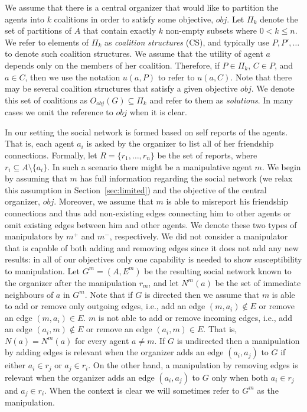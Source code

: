 \documentclass{article}
\def\tuple#1{( #1 )}
\begin{document}
We assume that there is a central organizer that would like to partition the agents into $k$ coalitions in order to satisfy some objective, $obj$.
Let $\Pi_k$ denote the set of partitions of $A$ that contain exactly $k$ non-empty subsets where $0 < k \leq n$. 
We refer to elements of $\Pi_k$ as \emph{coalition structures} (CS), and typically use $P, P', \ldots$ to denote such coalition structures.
We assume that the utility of agent $a$ depends only on the members of her coalition. Therefore, if $P \in \Pi_{k}$, $C\in P$, and $a\in C$, then we use the notation $u(a,P)$ to refer to $u(a,C)$.  
Note that there may be several coalition structures that satisfy a given objective $obj$. We denote this set of coalitions as $O_{obj}(G) \subseteq \Pi_k$ and refer to them as \emph{solutions}. In many cases we  omit the reference to $obj$ when it is clear.

In our setting the social network is formed based on self reports of the agents. That is, each agent $a_i$ is asked by the organizer to list all of her friendship connections. Formally, let $R=\{r_{1},\ldots, r_{n}\}$ be the set of reports, where $r_{i}\subseteq A\setminus\{a_{i}\}$.
In such a scenario there might be a manipulative agent $m$. We begin by assuming that $m$ has full information regarding the social network (we relax this assumption in Section~\ref{sec:limited}) and the objective of the central organizer, $obj$.
Moreover, we assume that $m$ is able to misreport his friendship connections and thus add non-existing edges connecting him to other agents or omit existing edges between him and other agents. %
We denote these two types of manipulators by $m^+$ and $m^-$, respectively. We did not consider a manipulator that is capable of both adding and removing edges since it does not add any new results: in all of our objectives only one capability is needed to show susceptibility to manipulation.
Let $G^m=\tuple{A,E^m}$ be the resulting social network known to the organizer after the manipulation $r_m$, and let $N^m(a)$ be the set of immediate neighbours of $a$ in $G^m$.
Note that if $G$ is directed then we assume that $m$ is able to add or remove only outgoing edges, i.e., add an edge $(m,a_i) \notin E$ or remove an edge $(m,a_i) \in E$. $m$ is not able to add or remove incoming edges, i.e., add an edge $(a_i,m) \notin E$ or remove an edge $(a_i,m) \in E$. That is, $N(a)=N^m(a)$ for every agent $a \neq m$. 
If $G$ is undirected then a manipulation by adding edges is relevant when the organizer adds an edge $(a_i,a_j)$ to $G$ if either $a_i\in r_j$ or $a_j\in r_i$. On the other hand, a manipulation by removing edges is relevant when the organizer adds an edge $(a_i,a_j)$ to $G$ only when both $a_i\in r_j$ and $a_j\in r_i$.
When the context is clear we will sometimes refer to $G^m$ as the manipulation.
 
\end{document}
